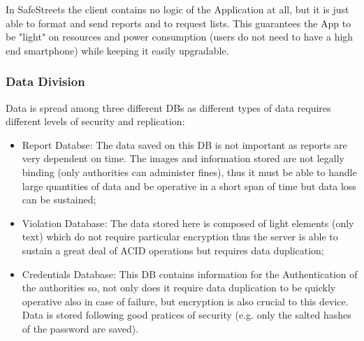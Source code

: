 In SafeStreets the client contains no logic of the 
Application at all, but it is just able to format 
and send reports and to request lists.
This guarantees the App to be "light" on resources 
and power consumption (users do not need to 
have a high end smartphone) while keeping it easily 
upgradable.

\subsubsection{Data Division}

Data is spread among three different DBs as 
different types of data requires different levels 
of security and replication:

\begin{itemize}

    \item  Report Databse: The data saved on this 
    DB is not important as reports are very dependent 
    on time. The images and information stored are not 
    legally binding (only authorities can administer 
    fines), thus it must be able to handle large 
    quantities of data and be operative in a short 
    span of time but data loss can be sustained;

    \item Violation Database: The data stored here 
    is composed of light elements (only text) 
    which do not require particular encryption 
    thus the server is able to sustain a great 
    deal of ACID operations but requires data 
    duplication;

    \item Credentials Database: This DB contains 
    information for the Authentication of the 
    authorities so, not only does it require data 
    duplication to be quickly operative also in 
    case of failure, but encryption is also 
    crucial to this device. Data is stored 
    following good pratices of security (e.g. 
    only the salted hashes of the password are 
    saved).     

\end{itemize}